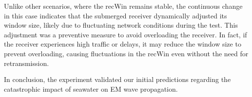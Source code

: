 Unlike other scenarios, where the recWin remains stable, the continuous change in this case indicates that the submerged receiver dynamically adjusted its window size, likely due to fluctuating network conditions during the test. This adjustment was a preventive measure to avoid overloading the receiver. In fact, if the receiver experiences high traffic or delays, it may reduce the window size to prevent overloading, causing fluctuations in the recWin even without the need for retransmission.

In conclusion, the experiment validated our initial predictions regarding the catastrophic impact of seawater on EM wave propagation.